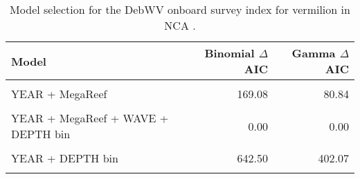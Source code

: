 \documentclass[
]{article}
\begin{document}
\begin{table}

\caption{\label{tab:tab-model-select-debwv}Model selection for the DebWV onboard survey index for vermilion in NCA .}
\centering
\begin{tabular}[t]{lrr}
\toprule
Model & Binomial $\Delta$AIC & Gamma $\Delta$AIC\\
\midrule
\cellcolor{gray!6}{1} & \cellcolor{gray!6}{1011.38} & \cellcolor{gray!6}{402.07}\\
YEAR + MegaReef & 169.08 & 80.84\\
\cellcolor{gray!6}{YEAR + MegaReef + WAVE} & \cellcolor{gray!6}{120.32} & \cellcolor{gray!6}{57.19}\\
YEAR + MegaReef + WAVE + DEPTH bin & 0.00 & 0.00\\
\cellcolor{gray!6}{YEAR + WAVE + DEPTH bin} & \cellcolor{gray!6}{611.73} & \cellcolor{gray!6}{252.61}\\
\addlinespace
YEAR + DEPTH bin & 642.50 & 402.07\\
\cellcolor{gray!6}{YEAR + MegaReef + DEPTH bin} & \cellcolor{gray!6}{55.30} & \cellcolor{gray!6}{14.94}\\
\bottomrule
\end{tabular}
\end{table}
\end{document}
